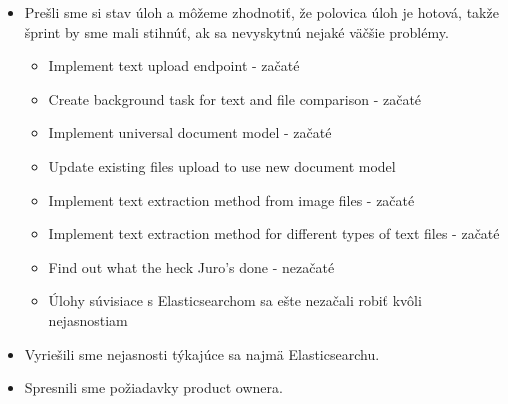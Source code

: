 \documentclass{article}
\begin{document}
    \begin{itemize}
        \item Prešli sme si stav úloh a môžeme zhodnotiť, že polovica úloh je hotová, takže šprint by sme mali stihnúť, ak sa nevyskytnú nejaké väčšie problémy.
        \begin{itemize}
            \item Implement text upload endpoint - začaté
            \item Create background task for text and file comparison - začaté
            \item Implement universal document model - začaté
            \item Update existing files upload to use new document model
            \item Implement text extraction method from image files - začaté
            \item Implement text extraction method for different types of text files - začaté
            \item Find out what the heck Juro’s done - nezačaté
            \item Úlohy súvisiace s Elasticsearchom sa ešte nezačali robiť kvôli nejasnostiam            
        \end{itemize}
        \item Vyriešili sme nejasnosti týkajúce sa najmä Elasticsearchu. 
        \item Spresnili sme požiadavky product ownera.
    \end{itemize}
\end{document}
